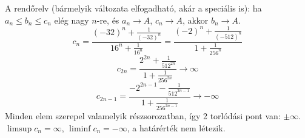 \documentclass[11pt]{scrartcl}
\begin{document}
A rendőrelv (bármelyik változata elfogadható, akár a speciális is): ha
$a_n \le b_n \le c_n$ elég nagy $n$-re, és $a_n \to A$, $c_n \to A$, akkor
$b_n \to A$.
\[
	c_n
	= \frac{(-32)^n + \frac{1}{(-32)^n}}{16^n + \frac{1}{16^n}}
	= \frac{(-2)^n + \frac{1}{(-512)^n}}{1 + \frac{1}{256^n}}
\]
\[
	c_{2n}
	= \frac{2^{2n} + \frac{1}{512^{2n}}}{1 + \frac{1}{256^{2n}}}
	\to \infty
\]
\[
	c_{2n - 1}
	= \frac{-2^{2n - 1} - \frac{1}{512^{2n - 1}}}{1 + \frac{1}{256^{2n - 1}}}
	\to -\infty
\]
Minden elem szerepel valamelyik részsorozatban, így 2 torlódási pont van:
$\pm \infty$. $\limsup c_n = \infty$, $\liminf c_n = -\infty$, a határérték
nem létezik.
\end{document}
